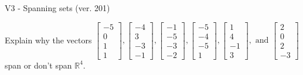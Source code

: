 \begin{exercise}
  \begin{exerciseTitle}V3 - Spanning sets (ver. 201)\end{exerciseTitle}
  \begin{exerciseStatement}
    Explain why the vectors \(\left[\begin{array}{r}
-5 \\
0 \\
1 \\
1
\end{array}\right] , \left[\begin{array}{r}
-4 \\
3 \\
-3 \\
-1
\end{array}\right] , \left[\begin{array}{r}
-1 \\
-5 \\
-3 \\
-2
\end{array}\right] , \left[\begin{array}{r}
-5 \\
-4 \\
-5 \\
1
\end{array}\right] , \left[\begin{array}{r}
1 \\
4 \\
-1 \\
3
\end{array}\right] , \text{ and } \left[\begin{array}{r}
2 \\
0 \\
2 \\
-3
\end{array}\right]\) span or don't span \(\mathbb{R}^4\). 
	



\end{exerciseStatement}
\end{exercise}
